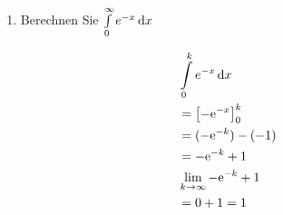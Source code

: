 	\begin{enumerate}
		\item Berechnen Sie $\int\limits^\infty_0 e^{-x}\,\mathrm{d} x$
	\end{enumerate}
	\begin{lsg}{}
		\begin{align*}
			&\int\limits^k_0 e^{-x}\,\mathrm{d} x\\
			&=\left[-\mathrm{e}^{-x}\right]_0^k\\
			&=(-\mathrm{e}^{-k})-(-1)\\
			&=-\mathrm{e}^{-k}+1\\
			&\lim\limits_{k\rightarrow \infty}-\mathrm{e}^{-k}+1\\
			&=0+1=1
		\end{align*}
	\end{lsg}




